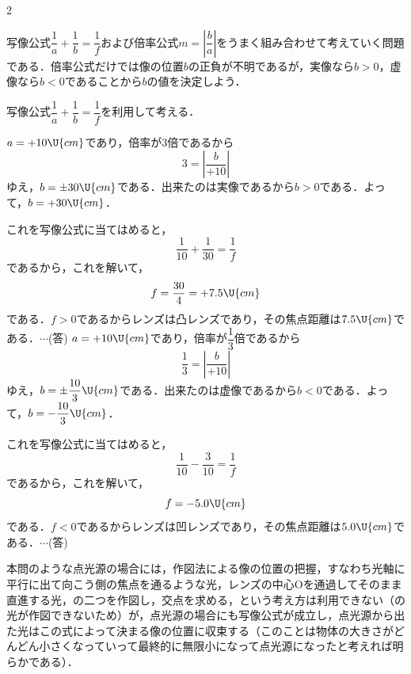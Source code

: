 \begin{multicols}{2}
\par\nopagebreak
\begin{sisin}
写像公式$\dfrac{1}{a}+\dfrac{1}{b}=\dfrac{1}{f}$および倍率公式$m=\left|\dfrac{b}{a}\right|$をうまく組み合わせて考えていく問題である．倍率公式だけでは像の位置$b$の正負が不明であるが，{\gtfamily 実像なら$b>0$，虚像なら$b<0$}であることから$b$の値を決定しよう．
\end{sisin}
\KaiHead
\hspace{1zw}写像公式$\dfrac{1}{a}+\dfrac{1}{b}=\dfrac{1}{f}$を利用して考える．
\begin{komon}
 $a=+10\U{cm}$であり，倍率が3倍であるから
       \[3=\left|\frac{b}{+10}\right|\]
       ゆえ，$b=\pm 30\U{cm}$である．出来たのは実像であるから$b>0$である．よって，$b=+30\U{cm}$．

       これを写像公式に当てはめると，
       \[\frac{1}{10}+\frac{1}{30}=\frac{1}{f}\]
       であるから，これを解いて，
       \[f=\frac{30}{4}=+7.5\U{cm}\]
       である．$f>0$であるからレンズは凸レンズであり，その焦点距離は$7.5\U{cm}$である．\hspace{0.25zw}\mbox{$\cdots$(答)}
 $a=+10\U{cm}$であり，倍率が$\dfrac{1}{3}$倍であるから
       \[\frac{1}{3}=\left|\frac{b}{+10}\right|\]
       ゆえ，$b=\pm\dfrac{10}{3}\U{cm}$である．出来たのは虚像であるから$b<0$である．よって，$b=-\dfrac{10}{3}\U{cm}$．

       これを写像公式に当てはめると，
       \[\frac{1}{10}-\frac{3}{10}=\frac{1}{f}\]
       であるから，これを解いて，
       \[f=-5.0\U{cm}\]
       である．$f<0$であるからレンズは凹レンズであり，その焦点距離は$5.0\U{cm}$である．\hspace{0.25zw}\mbox{$\cdots$(答)}
\end{komon}

\par\nopagebreak
\begin{sisin}
本問のような点光源の場合には，作図法による像の位置の把握，すなわち光軸に平行に出て向こう側の焦点を通るような光，レンズの中心$\mathrm{O}$を通過してそのまま直進する光，の二つを作図し，交点を求める，という考え方は利用できない（の光が作図できないため）が，{\gtfamily 点光源の場合にも写像公式が成立し，点光源から出た光はこの式によって決まる像の位置に収束する}（このことは物体の大きさがどんどん小さくなっていって最終的に無限小になって点光源になったと考えれば明らかである）．


\end{sisin}
\end{multicols}
